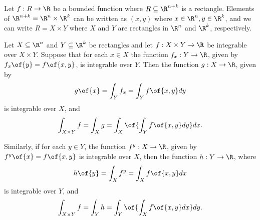 Let $f: R \to \R$ be a bounded function where $R \subseteq \R^{n+k}$ is a rectangle. Elements of $\R^{n+k} = \R^n \times \R^k$ can be written as $(x,y)$ where $x \in \R^n, y \in \R^k$, and we can write $R = X \times Y$ where $X$ and $Y$ are rectangles in $\R^n$ and $\R^k$, respectively.

\begin{theorem}
	Let $X \subseteq \R^n$ and $Y \subseteq \R^k$ be rectangles and let $f: X \times Y \to \R$ be integrable over $X \times Y$. Suppose that for each $x \in X$ the function $f_x: Y \to \R$, given by $f_x\of{y} = f\of{x,y}$, is integrable over $Y$. Then the function $g: X \to \R$, given by \[g\of{x} = \int_Y f_x = \int_Y f\of{x,y} dy\] is integrable over $X$, and \[\int_{X \times Y} f = \int_X g = \int_X \of{ \int_Y f\of{x,y} dy} dx.\]

	Similarly, if for each $y \in Y$, the function $f^y: X \to \R$, given by $f^y\of{x} = f\of{x,y}$ is integrable over $X$, then the function $h: Y \to \R$, where \[h\of{y} = \int_X f^y = \int_X f\of{x,y} dx\] is integrable over $Y$, and \[\int_{X \times Y} f = \int_Y h = \int_Y \of{ \int_X f\of{x,y} dx} dy.\]
\end{theorem}
